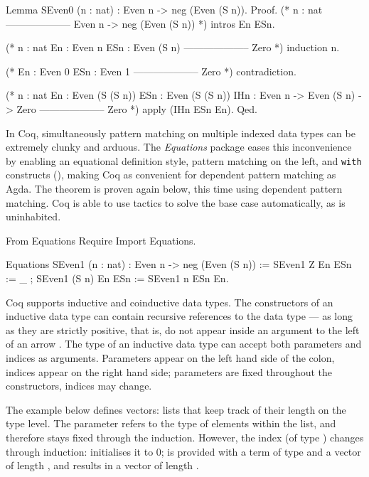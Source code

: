 \documentclass{mproj}
\begin{document}
\begin{coq}
    Lemma SEven0 (n : nat) : Even n -> neg (Even (S n)).
    Proof.
      (* n : nat
         --------------------
         Even n -> neg (Even (S n)) *)
      intros En ESn.

      (* n : nat 
         En : Even n
         ESn : Even (S n)
         --------------------
         Zero *)
      induction n.

      (* En : Even 0
         ESn : Even 1
         --------------------
         Zero *)
      contradiction.

      (* n : nat
         En : Even (S (S n))
         ESn : Even (S (S n))
         IHn : Even n -> Even (S n) -> Zero
         --------------------
         Zero *)
      apply (IHn ESn En).
    Qed.
\end{coq}

In Coq, simultaneously pattern matching on multiple indexed data types can be extremely clunky and arduous. The \emph{Equations} package eases this inconvenience by enabling an equational definition style, pattern matching on the left, and \texttt{with} constructs (\cite{McBride2004}), making Coq as convenient for dependent pattern matching as Agda. The theorem  is proven again below, this time using dependent pattern matching. Coq is able to use tactics to solve the base case automatically, as  is uninhabited.

\begin{coq}
    From Equations Require Import Equations.

    Equations SEven1 (n : nat) : Even n -> neg (Even (S n)) := {
    SEven1 Z     En ESn := _ ;
    SEven1 (S n) En ESn := SEven1 n ESn En}.
\end{coq}

Coq supports inductive and coinductive data types. The constructors of an inductive data type can contain recursive references to the data type --- as long as they are strictly positive, that is, do not appear inside an argument to the left of an arrow \cite{Dybjer1994}. The type of an inductive data type can accept both parameters and indices as arguments. Parameters appear on the left hand side of the colon, indices appear on the right hand side; parameters are fixed throughout the constructors, indices may change.

The example below defines vectors: lists that keep track of their length on the type level. The parameter  refers to the type of elements within the list, and therefore stays fixed through the induction. However, the index (of type ) changes through induction:  initialises it to 0;  is provided with a term of type  and a vector of length , and results in a vector of length .
\end{document}
